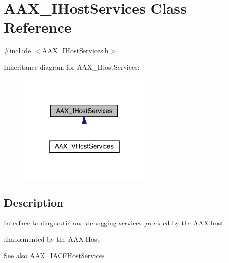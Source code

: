 \hypertarget{a01841}{}\section{A\+A\+X\+\_\+\+I\+Host\+Services Class Reference}
\label{a01841}


{\ttfamily \#include $<$A\+A\+X\+\_\+\+I\+Host\+Services.\+h$>$}



Inheritance diagram for A\+A\+X\+\_\+\+I\+Host\+Services\+:
\nopagebreak
\begin{figure}[H]
\begin{center}
\leavevmode
\includegraphics[width=187pt]{a01840}
\end{center}
\end{figure}


\subsection{Description}
Interface to diagnostic and debugging services provided by the A\+AX host. 

\begin{DoxyRefDesc}{\+:\+Implemented by the A\+A\+X Host}
\item[\mbox{\hyperlink{a00790__aax_host_implementation000008}{\+:\+Implemented by the A\+A\+X Host}}]\end{DoxyRefDesc}


\begin{DoxySeeAlso}{See also}
\mbox{\hyperlink{a01713}{A\+A\+X\+\_\+\+I\+A\+C\+F\+Host\+Services}} 
\end{DoxySeeAlso}
